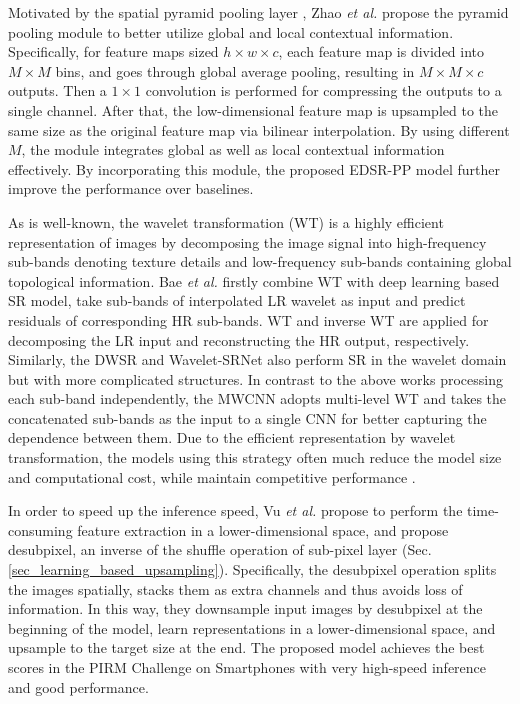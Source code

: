 {\label{sec_pyramid_pooling}
Motivated by the spatial pyramid pooling layer , Zhao \textit{et al.}  propose the pyramid pooling module to better utilize global and local contextual information.
Specifically, for feature maps sized $h\times w\times c$, each feature map is divided into $M\times M$ bins, and goes through global average pooling, resulting in $M\times M\times c$ outputs.
Then a $1\times 1$ convolution is performed for compressing the outputs to a single channel.
After that, the low-dimensional feature map is upsampled to the same size as the original feature map via bilinear interpolation.
By using different $M$, the module integrates global as well as local contextual information effectively.
By incorporating this module, the proposed EDSR-PP model  further improve the performance over baselines.

\label{sec_wavelet_transformation}
As is well-known, the wavelet transformation (WT)  is a highly efficient representation of images by decomposing the image signal into high-frequency sub-bands denoting texture details and low-frequency sub-bands containing global topological information.
Bae \textit{et al.}  firstly combine WT with deep learning based SR model, take sub-bands of interpolated LR wavelet as input and predict residuals of corresponding HR sub-bands.
WT and inverse WT are applied for decomposing the LR input and reconstructing the HR output, respectively.
Similarly, the DWSR  and Wavelet-SRNet  also perform SR in the wavelet domain but with more complicated structures.
In contrast to the above works processing each sub-band independently, the MWCNN  adopts multi-level WT and takes the concatenated sub-bands as the input to a single CNN for better capturing the dependence between them.
Due to the efficient representation by wavelet transformation, the models using this strategy often much reduce the model size and computational cost, while maintain competitive performance .

\label{sec_desubpixel}
In order to speed up the inference speed, Vu \textit{et al.}  propose to perform the time-consuming feature extraction in a lower-dimensional space, and propose desubpixel, an inverse of the shuffle operation of sub-pixel layer (Sec. \ref{sec_learning_based_upsampling}).  
Specifically, the desubpixel operation splits the images spatially, stacks them as extra channels and thus avoids loss of information.
In this way, they downsample input images by desubpixel at the beginning of the model, learn representations in a lower-dimensional space, and upsample to the target size at the end.  
The proposed model achieves the best scores in the PIRM Challenge on Smartphones  with very high-speed inference and good performance.

}
